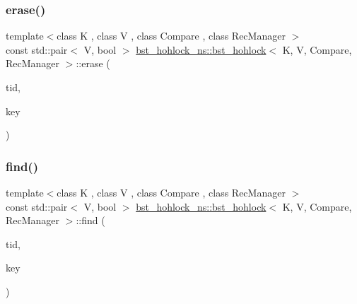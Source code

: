 \mbox{\label{classbst__hohlock__ns_1_1bst__hohlock_a16e17ba2d555f92e099637df6de96fdc}} 
\subsubsection{\texorpdfstring{erase()}{erase()}}
{\footnotesize\ttfamily template$<$class K , class V , class Compare , class Rec\+Manager $>$ \\
const std\+::pair$<$ V, bool $>$ \hyperlink{classbst__hohlock__ns_1_1bst__hohlock}{bst\+\_\+hohlock\+\_\+ns\+::bst\+\_\+hohlock}$<$ K, V, Compare, Rec\+Manager $>$\+::erase (\begin{DoxyParamCaption}\item[{const int}]{tid,  }\item[{const K \&}]{key }\end{DoxyParamCaption})}

\mbox{\label{classbst__hohlock__ns_1_1bst__hohlock_aca8b371dd3fdd717419b00093a22490a}} 
\subsubsection{\texorpdfstring{find()}{find()}}
{\footnotesize\ttfamily template$<$class K , class V , class Compare , class Rec\+Manager $>$ \\
const std\+::pair$<$ V, bool $>$ \hyperlink{classbst__hohlock__ns_1_1bst__hohlock}{bst\+\_\+hohlock\+\_\+ns\+::bst\+\_\+hohlock}$<$ K, V, Compare, Rec\+Manager $>$\+::find (\begin{DoxyParamCaption}\item[{const int}]{tid,  }\item[{const K \&}]{key }\end{DoxyParamCaption})}

\mbox{\label{classbst__hohlock__ns_1_1bst__hohlock_a2103fba4aa6854a65ec07dee69b04948}} 
